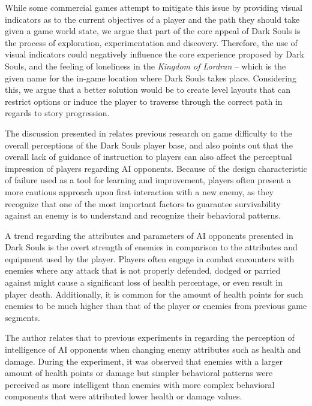 While some commercial games attempt to mitigate this issue by providing visual indicators as to the current objectives of a player and the path they should take given a game world state, we argue that part of the core appeal of Dark Souls is the process of exploration, experimentation and discovery. Therefore, the use of visual indicators could negatively influence the core experience proposed by Dark Souls, and the feeling of loneliness in the \emph{Kingdom of Lordran} -- which is the given name for the in-game location where Dark Souls takes place. Considering this, we argue that a better solution would be to create level layouts that can restrict options or induce the player to traverse through the correct path in regards to story progression.


The discussion presented in \cite{YT_DarkSoulsSimpleAI} relates previous research on game difficulty to the overall perceptions of the Dark Souls player base, and also points out that the overall lack of guidance of instruction to players can also affect the perceptual impression of players regarding AI opponents. Because of the design characteristic of failure used as a tool for learning and improvement, players often present a more cautious approach upon first interaction with a new enemy, as they recognize that one of the most important factors to guarantee survivability against an enemy is to understand and recognize their behavioral patterns. 

A trend regarding the attributes and parameters of AI opponents presented in Dark Souls is the overt strength of enemies in comparison to the attributes and equipment used by the player.  Players often engage in combat encounters with enemies where any attack that is not properly defended, dodged or parried against might cause a significant loss of health percentage, or even result in player death. Additionally, it is common for the amount of health points for such enemies to be much higher than that of the player or enemies from previous game segments.

The author relates that to previous experiments in \cite{URL_IllusionOfIntelligence} regarding the perception of intelligence of AI opponents when changing enemy attributes such as health and damage. During the experiment, it was observed that enemies with a larger amount of health points or damage but simpler behavioral patterns were perceived as more intelligent than enemies with more complex behavioral components that were attributed lower health or damage values.  


